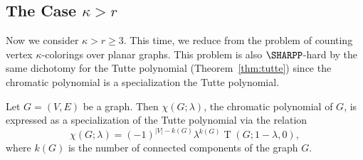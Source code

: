 \documentclass[11pt]{article}
\begin{document}
\subsection{The Case \texorpdfstring{$\kappa > r$}{kappa-greater-than-r}} \label{subsec:k>r}

Now we consider $\kappa > r \ge 3$.
This time, we reduce from the problem of counting vertex $\kappa$-colorings over planar graphs.
This problem is also $\SHARPP$-hard by the same dichotomy for the Tutte polynomial (Theorem~\ref{thm:tutte})
since the chromatic polynomial is a specialization the Tutte polynomial.

\begin{proposition} \label{prop:k>r:chromatic_tutte}
 Let $G = (V,E)$ be a graph.
 Then $\chi(G; \lambda)$,
 the chromatic polynomial of $G$,
 is expressed as a specialization of the Tutte polynomial via the relation
 \[
  \chi(G; \lambda) = (-1)^{|V| - k(G)} \lambda^{k(G)} \operatorname{T}(G; 1 - \lambda, 0),
 \]
 where $k(G)$ is the number of connected components of the graph $G$.
\end{proposition}
\end{document}
